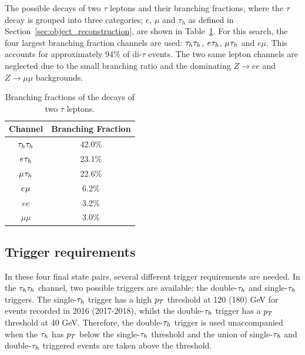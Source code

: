 The possible decays of two $\tau$ leptons and their branching fractions, where the $\tau$ decay is grouped into three categories; $e$, $\mu$ and $\tau_h$ as defined in Section~\ref{sec:object_reconstruction}, are shown in Table~\ref{tab:ditau_br}. 
For this search, the four largest branching fraction channels are used: $\tau_{h}\tau_{h}$, $e_{}\tau_{h}$, $\mu_{}\tau_{h}$ and $e\mu$.
This accounts for approximately 94\% of di-$\tau$ events.
The two same lepton channels are neglected due to the small branching ratio and the dominating $Z\rightarrow ee$ and $Z\rightarrow \mu\mu$ backgrounds. \\

\begin{table}[t]
    \centering
    \begin{tabular}{|c|c|}
         \hline
         Channel & Branching Fraction  \\
         \hline
         \hline
         $\tau_{h}\tau_{h}$ & 42.0\% \\
         $e_{}\tau_{h}$ & 23.1\% \\
         $\mu_{}\tau_{h}$ & 22.6\% \\
         $e_{}\mu_{}$ & 6.2\% \\
         $e e$ & 3.2\% \\
         $\mu \mu$ & 3.0\% \\
         \hline
    \end{tabular}
    \caption[Branching fractions of the decays of two $\tau$ leptons.]{Branching fractions of the decays of two $\tau$ leptons.}
    \label{tab:ditau_br}
\end{table}

\subsection{Trigger requirements}
\label{sec:trig_ditau}

In these four final state pairs, several different trigger requirements are needed.
In the $\tau_{h}\tau_{h}$ channel, two possible triggers are available: the double-$\tau_{h}$ and single-$\tau_{h}$ triggers.
The single-$\tau_{h}$ trigger has a high $p_{T}$ threshold at 120 (180) GeV for events recorded in 2016 (2017-2018), whilst the double-$\tau_{h}$ trigger has a $p_{T}$ threshold at 40 GeV.
Therefore, the double-$\tau_{h}$ trigger is used unaccompanied when the $\tau_{h}$ has $p_{T}$ below the single-$\tau_{h}$ threshold and the union of single-$\tau_{h}$ and double-$\tau_{h}$ triggered events are taken above the threshold. \\

